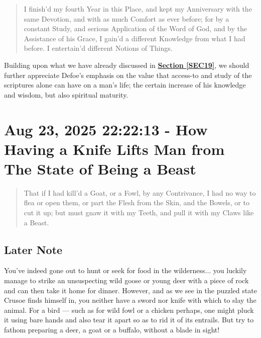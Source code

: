 \documentclass[a4paper]{article}
\begin{document}
\noindent
\begin{minipage}{1\textwidth}
\vspace{1em}
\begin{quotation}
{\ttfamily


I finish’d my fourth Year in this Place, and kept my Anniversary with the same Devotion, and with as much Comfort as ever before; for by a constant Study, and serious Application of the Word of God, and by the Assistance of his Grace, I gain’d a different Knowledge from what I had before. I entertain’d different Notions of Things.

}
\end{quotation}
\vspace{1em}
\end{minipage}



Building upon what we have already discussed in \textbf{\hyperref[SEC19]{Section \ref{SEC19}}}, we should further appreciate Defoe's emphasis on the value that access-to and study of the scriptures alone can have on a man's life; the certain increase of his knowledge and wisdom, but also spiritual maturity.




\section{Aug 23, 2025 22:22:13 - How Having a Knife Lifts Man from The State of Being a Beast}
\label{SEC30}



\noindent
\begin{minipage}{1\textwidth}
\vspace{1em}
\begin{quotation}
{\ttfamily


That if I had kill’d a Goat, or a Fowl, by any Contrivance, I had no way to flea or open them, or part the Flesh from the Skin, and the Bowels, or to cut it up; but must gnaw it with my Teeth, and pull it with my Claws like a Beast.

}
\end{quotation}
\vspace{1em}
\end{minipage}


\subsection{Later Note}

You've indeed gone out to hunt or seek for food in the wilderness... you luckily manage to strike an unsuspecting wild goose or young deer with a piece of rock and can then take it home for dinner. However, and as we see in the puzzled state Crusoe finds himself in, you neither have a sword nor knife with which to slay the animal. For a bird --- such as for wild fowl or a chicken perhaps, one might pluck it using bare hands and also tear it apart so as to rid it of its entrails. But try to fathom preparing a deer, a goat or a buffalo, without a blade in sight! 
\end{document}
